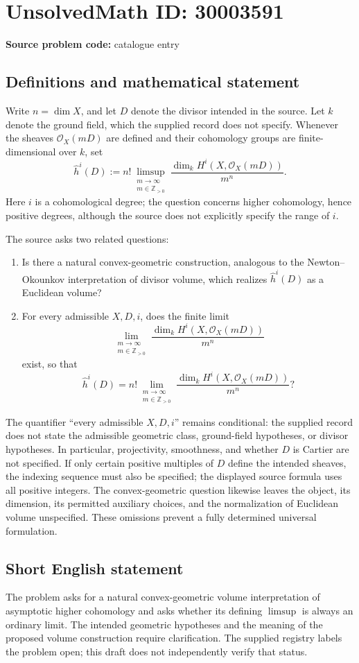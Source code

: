 \documentclass[11pt]{article}
\newcommand{\Z}{\mathbb{Z}}
\begin{document}
\section*{UnsolvedMath ID: 30003591}
\textbf{Source problem code:} catalogue entry
\subsection{Definitions and mathematical statement}
Write \(n=\dim X\), and let \(D\) denote the divisor intended in the source. Let \(k\) denote the ground field, which the supplied record does not specify. Whenever the sheaves \(\mathcal O_X(mD)\) are defined and their cohomology groups are finite-dimensional over \(k\), set
\[
\widehat h^i(D):=n!\limsup_{\substack{m\to\infty\\m\in\Z_{>0}}}\frac{\dim_k H^i(X,\mathcal O_X(mD))}{m^n}.
\]
Here \(i\) is a cohomological degree; the question concerns higher cohomology, hence positive degrees, although the source does not explicitly specify the range of \(i\).

The source asks two related questions:
\begin{enumerate}
\item Is there a natural convex-geometric construction, analogous to the Newton--Okounkov interpretation of divisor volume, which realizes \(\widehat h^i(D)\) as a Euclidean volume?
\item For every admissible \(X,D,i\), does the finite limit
\[
\lim_{\substack{m\to\infty\\m\in\Z_{>0}}}\frac{\dim_k H^i(X,\mathcal O_X(mD))}{m^n}
\]
exist, so that
\[
\widehat h^i(D)=n!\lim_{\substack{m\to\infty\\m\in\Z_{>0}}}\frac{\dim_k H^i(X,\mathcal O_X(mD))}{m^n}?
\]
\end{enumerate}
The quantifier ``every admissible \(X,D,i\)'' remains conditional: the supplied record does not state the admissible geometric class, ground-field hypotheses, or divisor hypotheses. In particular, projectivity, smoothness, and whether \(D\) is Cartier are not specified. If only certain positive multiples of \(D\) define the intended sheaves, the indexing sequence must also be specified; the displayed source formula uses all positive integers. The convex-geometric question likewise leaves the object, its dimension, its permitted auxiliary choices, and the normalization of Euclidean volume unspecified. These omissions prevent a fully determined universal formulation.
\subsection{Short English statement}
The problem asks for a natural convex-geometric volume interpretation of asymptotic higher cohomology and asks whether its defining \(\limsup\) is always an ordinary limit. The intended geometric hypotheses and the meaning of the proposed volume construction require clarification. The supplied registry labels the problem open; this draft does not independently verify that status.
\end{document}
